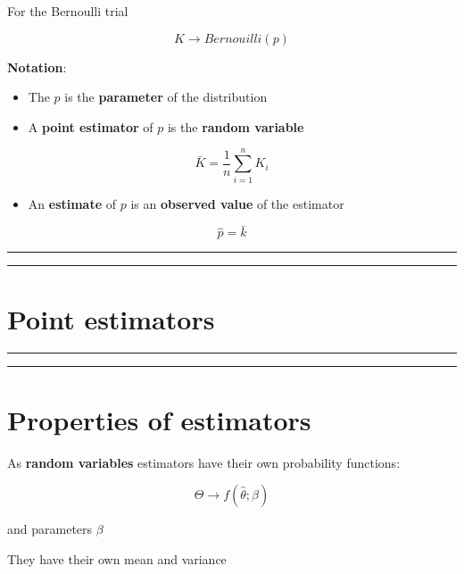 \documentclass[
]{book}
\providecommand{\tightlist}{%
  \setlength{\itemsep}{0pt}\setlength{\parskip}{0pt}}
\begin{document}
For the Bernoulli trial

\[K \rightarrow Bernouilli(p)\]

\textbf{Notation}:

\begin{itemize}
\item
  The \(p\) is the \textbf{parameter} of the distribution
\item
  A \textbf{point estimator} of \(p\) is the \textbf{random variable}
\end{itemize}

\[\bar{K}= \frac{1}{n}\sum_{i=1}^n K_i\]

\begin{itemize}
\tightlist
\item
  An \textbf{estimate} of \(p\) is an \textbf{observed value} of the estimator
\end{itemize}

\[\hat{p}=\bar{k}\]

\begin{center}\rule{0.5\linewidth}{0.5pt}\end{center}

\begin{center}\rule{0.5\linewidth}{0.5pt}\end{center}

\hypertarget{point-estimators-3}{%
\section{Point estimators}\label{point-estimators-3}}

\begin{center}\rule{0.5\linewidth}{0.5pt}\end{center}

\begin{center}\rule{0.5\linewidth}{0.5pt}\end{center}

\hypertarget{properties-of-estimators}{%
\section{Properties of estimators}\label{properties-of-estimators}}

As \textbf{random variables} estimators have their own probability functions:

\[\Theta \rightarrow f(\hat{\theta}; \beta)\]

and parameters \(\beta\)

They have their own mean and variance
\end{document}
